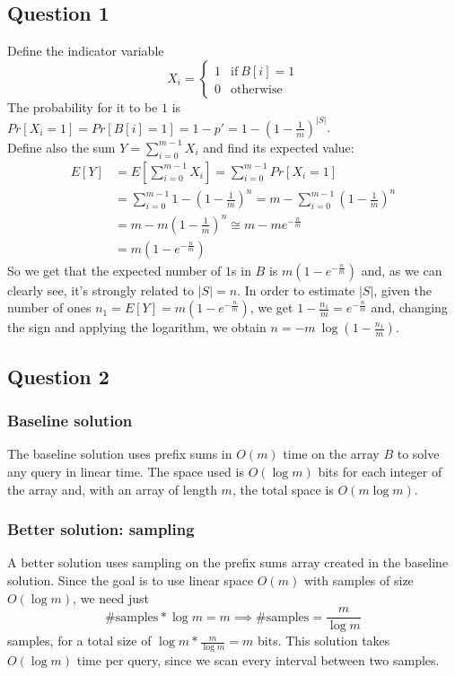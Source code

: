 \documentclass{article}
\begin{document}
\subsection{Question 1}
Define the indicator variable
$$
X_i=\begin{cases}
1 & \textrm{if}\ B[i]=1\\
0 & \textrm{otherwise}
\end{cases}
$$
The probability for it to be $1$ is $Pr[X_i=1]=Pr[B[i]=1]=1-p'=1-(1-\frac{1}{m})^{|S|}$.\\
Define also the sum $Y=\sum_{i=0}^{m-1} X_i$ and find its expected value:
\begin{align*}
E[Y]&=E\left[\sum_{i=0}^{m-1} X_i\right]=\sum_{i=0}^{m-1} Pr[X_i=1]\\
&=\sum_{i=0}^{m-1} 1-\left(1-\frac{1}{m}\right)^n = m-\sum_{i=0}^{m-1}\left(1-\frac{1}{m}\right)^n\\
&=m-m\left(1-\frac{1}{m}\right)^n \cong m-me^{-\frac{n}{m}}\\
&=m\left(1-e^{-\frac{n}{m}}\right)
\end{align*}
So we get that the expected number of $1$s in $B$ is $m(1-e^{-\frac{n}{m}})$ and, as we can clearly see, it's strongly related to $|S|=n$. 
In order to estimate $|S|$, given the number of ones $n_1=E[Y]=m(1-e^{-\frac{n}{m}})$, we get $1-\frac{n_1}{m}=e^{-\frac{n}{m}}$ and, changing the sign and applying the logarithm, we obtain $n=-m\ \log(1-\frac{n_1}{m})$.

\subsection{Question 2}
\subsubsection{Baseline solution}
The baseline solution uses prefix sums in $O(m)$ time on the array $B$ to solve any query in linear time.
The space used is $O(\log m)$ bits for each integer of the array and, with an array of length $m$, the total space is $O(m\log m)$.

\subsubsection{Better solution: sampling}
A better solution uses sampling on the prefix sums array created in the baseline solution. Since the goal is to use linear space $O(m)$ with samples of size $O(\log m)$, we need just $$\textrm{\# samples}*\log m=m \implies \textrm{\# samples}=\frac{m}{\log m}$$ samples, for a total size of $\log m*\frac{m}{\log m}=m$ bits. This solution takes $O(\log m)$ time per query, since we scan every interval between two samples.
\end{document}
